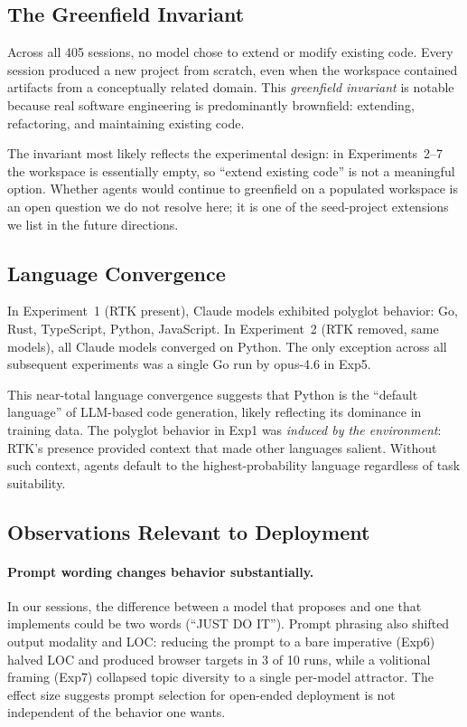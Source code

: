 \documentclass{article}
\begin{document}
\subsection{The Greenfield Invariant}

Across all 405 sessions, no model chose to extend or modify
existing code. Every session produced a new project from
scratch, even when the workspace contained artifacts from a
conceptually related domain. This \emph{greenfield invariant}
is notable because real software engineering is predominantly
brownfield: extending, refactoring, and maintaining existing
code.

The invariant most likely reflects the experimental design: in
Experiments~2--7 the workspace is essentially empty, so
``extend existing code'' is not a meaningful option. Whether
agents would continue to greenfield on a populated workspace
is an open question we do not resolve here; it is one of the
seed-project extensions we list in the future directions.

\subsection{Language Convergence}

In Experiment~1 (RTK present), Claude models exhibited polyglot
behavior: Go, Rust, TypeScript, Python, JavaScript. In
Experiment~2 (RTK removed, same models), all Claude models
converged on Python. The only exception across all subsequent
experiments was a single Go run by opus-4.6 in Exp5.

This near-total language convergence suggests that Python is the
``default language'' of LLM-based code generation, likely
reflecting its dominance in training data. The polyglot behavior
in Exp1 was \emph{induced by the environment}: RTK's presence
provided context that made other languages salient. Without such
context, agents default to the highest-probability language
regardless of task suitability.

\subsection{Observations Relevant to Deployment}

\paragraph{Prompt wording changes behavior substantially.} In
our sessions, the difference between a model that proposes and
one that implements could be two words (``JUST DO IT''). Prompt
phrasing also shifted output modality and LOC: reducing the
prompt to a bare imperative (Exp6) halved LOC and produced
browser targets in 3 of 10 runs, while a volitional framing
(Exp7) collapsed topic diversity to a single per-model
attractor. The effect size suggests prompt selection for
open-ended deployment is not independent of the behavior one
wants.
\end{document}
